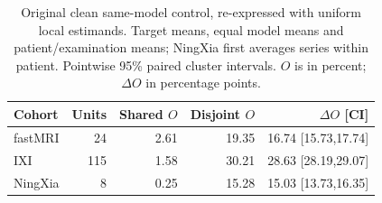 \begin{table}[t]\centering\small
\caption{Original clean same-model control, re-expressed with uniform local estimands. Target means, equal model means and patient/examination means; NingXia first averages series within patient. Pointwise 95\% paired cluster intervals. $O$ is in percent; $\Delta O$ in percentage points.}
\label{tab:controlled}\setlength{\tabcolsep}{3pt}
\begin{tabular}{lrrrr}\toprule Cohort & Units & Shared $O$ & Disjoint $O$ & $\Delta O$ [CI]\\\midrule
fastMRI & 24 & 2.61 & 19.35 & 16.74 [15.73,17.74] \\
IXI & 115 & 1.58 & 30.21 & 28.63 [28.19,29.07] \\
NingXia & 8 & 0.25 & 15.28 & 15.03 [13.73,16.35] \\\bottomrule\end{tabular}\end{table}